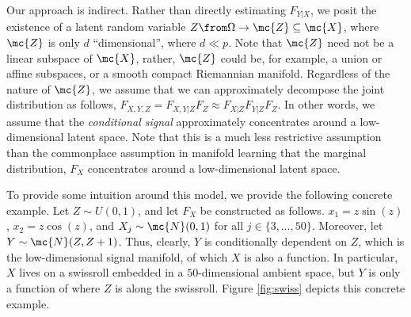 Our approach is indirect.  Rather than directly estimating $F_{Y|X}$, we posit the existence of 
a latent random variable $Z \from \Omega \to \mc{Z} \subseteq \mc{X}$, where $\mc{Z}$ is only $d$ ``dimensional'', where $d \ll p$.   
Note that $\mc{Z}$ need not be a linear subspace of $\mc{X}$, rather, $\mc{Z}$ could be, for example,  a union or affine subspaces, or a smooth compact Riemannian manifold.  Regardless of the nature of $\mc{Z}$, we assume that we can approximately decompose the joint distribution as follows,  $F_{X,Y,Z}=F_{X,Y|Z}F_Z \approx F_{X|Z} F_{Y|Z} F_Z$.  In other words, we assume that the \emph{conditional signal} approximately concentrates around a low-dimensional latent space.  Note that this is a much less restrictive assumption than the commonplace assumption in manifold learning that the marginal distribution, $F_X$ concentrates around a low-dimensional latent space.  



To provide some intuition around this model, we provide the following concrete example.
Let $Z \sim U(0,1)$, and let $F_X$ be constructed as follows. $x_1=z \sin (z)$, $x_2=z \cos (z)$, and $X_j \sim \mc{N}(0,1)$ for all $j \in \{3, \ldots, 50\}$.  Moreover, let $Y \sim \mc{N}(Z,Z+1)$.  Thus, clearly, $Y$ is conditionally dependent on $Z$, which is the low-dimensional signal manifold, of which $X$ is also a function.  In particular, $X$ lives on a swissroll embedded in a $50$-dimensional ambient space, but $Y$ is only a function of where $Z$ is along the swissroll. Figure \ref{fig:swiss} depicts this concrete example.


